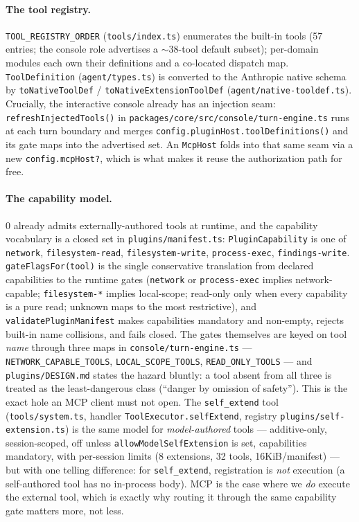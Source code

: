 \documentclass[11pt]{article}
\begin{document}
\paragraph{The tool registry.} \texttt{TOOL\_REGISTRY\_ORDER}
(\texttt{tools/index.ts}) enumerates the built-in tools (57 entries; the console
role advertises a $\sim$38-tool default subset); per-domain modules each own
their definitions and a co-located dispatch map. \texttt{ToolDefinition}
(\texttt{agent/types.ts}) is converted to the Anthropic native schema by
\texttt{toNativeToolDef} / \texttt{toNativeExtensionToolDef}
(\texttt{agent/native-tooldef.ts}). Crucially, the interactive console already
has an injection seam: \texttt{refreshInjectedTools()} in
\texttt{packages/core/src/console/turn-engine.ts} runs at each turn boundary and
merges \texttt{config.pluginHost.toolDefinitions()} and its gate maps into the
advertised set. An \texttt{McpHost} folds into that same seam via a new
\texttt{config.mcpHost?}, which is what makes it reuse the authorization path for
free.

\paragraph{The capability model.} 0 already admits externally-authored tools
at runtime, and the capability vocabulary is a closed set in
\texttt{plugins/manifest.ts}: \texttt{PluginCapability} is one of
\texttt{network}, \texttt{filesystem-read}, \texttt{filesystem-write},
\texttt{process-exec}, \texttt{findings-write}. \texttt{gateFlagsFor(tool)} is the
single conservative translation from declared capabilities to the runtime gates
(\texttt{network} or \texttt{process-exec} implies network-capable;
\texttt{filesystem-*} implies local-scope; read-only only when every capability
is a pure read; unknown maps to the most restrictive), and
\texttt{validatePluginManifest} makes capabilities mandatory and non-empty,
rejects built-in name collisions, and fails closed. The gates themselves are
keyed on tool \emph{name} through three maps in
\texttt{console/turn-engine.ts} --- \texttt{NETWORK\_CAPABLE\_TOOLS},
\texttt{LOCAL\_SCOPE\_TOOLS}, \texttt{READ\_ONLY\_TOOLS} --- and
\texttt{plugins/DESIGN.md} states the hazard bluntly: a tool absent from all
three is treated as the least-dangerous class (``danger by omission of
safety''). This is the exact hole an MCP client must not open. The
\texttt{self\_extend} tool (\texttt{tools/system.ts}, handler
\texttt{ToolExecutor.selfExtend}, registry \texttt{plugins/self-extension.ts}) is
the same model for \emph{model-authored} tools --- additive-only, session-scoped,
off unless \texttt{allowModelSelfExtension} is set, capabilities mandatory, with
per-session limits (8 extensions, 32 tools, 16KiB/manifest) --- but with one
telling difference: for \texttt{self\_extend}, registration is \emph{not}
execution (a self-authored tool has no in-process body). MCP is the case where we
\emph{do} execute the external tool, which is exactly why routing it through the
same capability gate matters more, not less.
\end{document}

